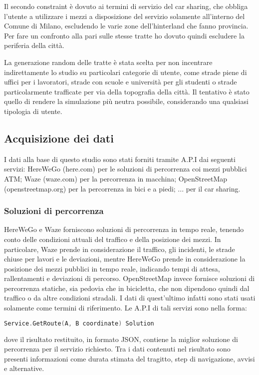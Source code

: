 Il secondo constraint è dovuto ai termini di servizio del car sharing, che obbliga l'utente a utilizzare i mezzi a disposizione del servizio solamente all'interno del Comune di Milano, escludendo le varie zone dell'hinterland che fanno provincia. Per fare un confronto alla pari sulle stesse tratte ho dovuto quindi escludere la periferia della città.

La generazione random delle tratte è stata scelta per non incentrare indirettamente lo studio su particolari categorie di utente, come strade piene di uffici per i lavoratori, strade con scuole e università per gli studenti o strade particolarmente trafficate per via della topografia della città. Il tentativo è stato quello di rendere la simulazione più neutra possibile, considerando una qualsiasi tipologia di utente.


\subsection{Acquisizione dei dati}

I dati alla base di questo studio sono stati forniti tramite A.P.I dai seguenti servizi: HereWeGo (here.com) per le soluzioni di percorrenza coi mezzi pubblici ATM; Waze (waze.com) per la percorrenza in macchina; OpenStreetMap (openstreetmap.org) per la percorrenza in bici e a piedi; ... per il car sharing.

\subsubsection{Soluzioni di percorrenza}

HereWeGo e Waze forniscono soluzioni di percorrenza in tempo reale, tenendo conto delle condizioni attuali del traffico e della posizione dei mezzi. In particolare, Waze prende in considerazione il traffico, gli incidenti, le strade chiuse per lavori e le deviazioni, mentre HereWeGo prende in considerazione la posizione dei mezzi pubblici in tempo reale, indicando tempi di attesa, rallentamenti e deviazioni di percorso. OpenStreetMap invece fornisce soluzioni di percorrenza statiche, sia pedovia che in bicicletta, che non dipendono quindi dal traffico o da altre condizioni stradali. I dati di quest'ultimo infatti sono stati usati solamente come termini di riferimento. Le A.P.I di tali servizi sono nella forma:
\begin{lstlisting}[language=Go]
Service.GetRoute(A, B coordinate) Solution
\end{lstlisting}
dove il risultato restituito, in formato JSON, contiene la miglior soluzione di percorrenza per il servizio richiesto. Tra i dati contenuti nel risultato sono presenti informazioni come durata stimata del tragitto, step di navigazione, avvisi e alternative.

